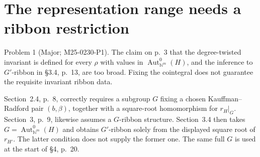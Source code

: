 \documentclass[10pt]{article}
\begin{document}
\section*{The representation range needs a ribbon restriction}
Problem 1 (Major; M25-0230-P1).  The claim on p. 3 that the degree-twisted invariant is defined for every \(\rho\) with values in \(\operatorname{Aut}^0_{\mathbb N^m}(H)\), and the inference to \(G'\)-ribbon in §3.4, p. 13, are too broad. Fixing the cointegral does not guarantee the requisite invariant ribbon data.\par
Section 2.4, p. 8, correctly requires a subgroup \(G\) fixing a chosen Kauffman–Radford pair \((b,\beta)\), together with a square-root homomorphism for \(r_H|_G\). Section 3, p. 9, likewise assumes a \(G\)-ribbon structure. Section 3.4 then takes \(G=\operatorname{Aut}^0_{\mathbb N^m}(H)\) and obtains \(G'\)-ribbon solely from the displayed square root of \(r_{H'}\). The latter condition does not supply the former one. The same full \(G\) is used at the start of §4, p. 20.\par
\end{document}
